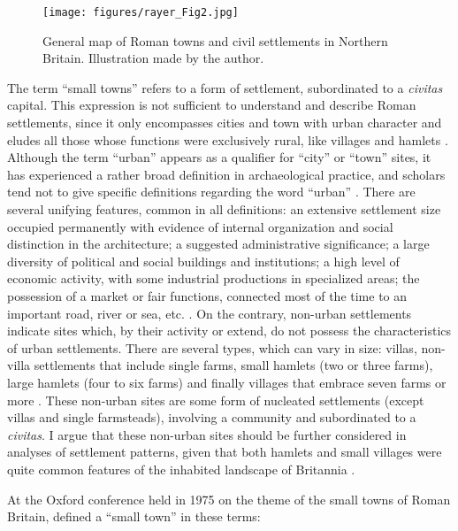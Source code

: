 	\begin{figure}
		\texttt{[image: figures/rayer\_Fig2.jpg]}
		\caption{General map of Roman towns and civil settlements in Northern Britain. Illustration made by the author.}
		\label{fig:Rayer_Fig2}
	\end{figure}
The term “small towns” refers to a form of settlement, subordinated to a \emph{civitas} capital. This expression is not sufficient to understand and describe Roman settlements, since it only encompasses cities and town with urban character and eludes all those whose functions were exclusively rural, like villages and hamlets \parencites{Favory_2012}{Rivet_1975b}{Smith_1987}{Todd_1970}{Wacher_1995}.
 Although the term “urban” appears as a qualifier for “city” or “town” sites, it has experienced a rather broad definition in archaeological practice, and scholars tend not to give specific definitions regarding the word “urban” \parencite[29]{Renfrew_2008}.
  There are several unifying features, common in all definitions: an extensive settlement size occupied permanently with evidence of internal organization and social distinction in the architecture; a suggested administrative significance; a large diversity of political and social buildings and institutions; a high level of economic activity, with some industrial productions in specialized areas; the possession of a market or fair functions, connected most of the time to an important road, river or sea, etc. \parencite[29]{Renfrew_2008}.
   On the contrary, non-urban settlements indicate sites which, by their activity or extend, do not possess the characteristics of urban settlements. There are several types, which can vary in size: villas, non-villa settlements that include single farms, small hamlets (two or three farms), large hamlets (four to six farms) and finally villages that embrace seven farms or more \parencite[76]{Hingley_1989}. These non-urban sites are some form of nucleated settlements (except villas and single farmsteads), involving a community and subordinated to a \emph{civitas}. I argue that these non-urban sites should be further considered in analyses of settlement patterns, given that both hamlets and small villages were quite common features of the inhabited landscape of Britannia \parencites[cf.][]{Hingley_1989}{Hanley_2000}. 

At the Oxford conference held in 1975 on the theme of the small towns of Roman Britain, \textcite[1]{Rodwell_1975} defined a “small town” in these terms:


